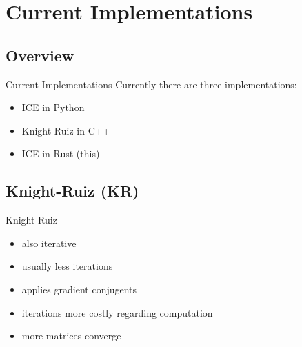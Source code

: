 \section{Current Implementations}

\subsection{Overview}

\begin{frame}[c]{Current Implementations}
    Currently there are three implementations:
    \pause
    \begin{itemize}[<+->]
        \item ICE in Python
        \item Knight-Ruiz in C++
        \item ICE in Rust (this)
    \end{itemize}
\end{frame}


\subsection{Knight-Ruiz (KR)}

\begin{frame}[c]{Knight-Ruiz}
    \begin{itemize}[<+(1)->]
        \item also iterative
        \item usually less iterations
        \item applies gradient conjugents
        \item iterations more costly regarding computation
        \item more matrices converge
    \end{itemize}
\end{frame}

